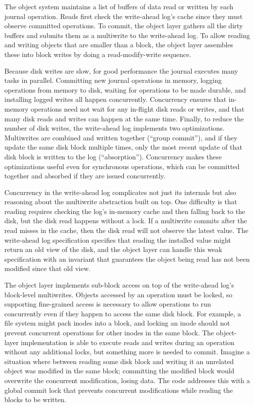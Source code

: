 The object system maintains a list of buffers of data read or written by each journal operation.
Reads first check the write-ahead log's cache since
they must observe committed operations. To commit, the object
layer gathers all the dirty buffers and submits them as a multiwrite to the
write-ahead log. To allow reading and writing objects that are smaller than a
block, the object layer assembles these into block writes by doing a
read-modify-write sequence.

Because disk writes are slow, for good performance the journal executes many
tasks in parallel. Committing new journal operations in memory, logging operations
from memory to disk, waiting for operations to be made durable, and
installing logged writes all happen concurrently.  Concurrency ensures that
in-memory operations
need not wait for any in-flight disk reads or writes, and that many
disk reads and writes can happen at the same time.  Finally, to reduce the
number of disk writes, the write-ahead log implements two optimizations.
Multiwrites are combined and written
together (``group commit''), and if they update the same disk
block multiple times, only the most recent update of that disk block is
written to the log (``absorption''). Concurrency makes these optimizations
useful even for synchronous operations, which can be committed together and
absorbed if they are issued concurrently.

Concurrency in the write-ahead log complicates not just its internals but also
reasoning about the multiwrite abstraction built on top. One difficulty is that
reading requires checking the log's in-memory cache and then falling back to the disk,
but the disk read happens without a lock. If a multiwrite commits after the read
misses in the cache, then the disk read will not observe the latest value. The
write-ahead log specification specifies that reading the installed value might return an
old view of the disk, and the object layer can handle this weak specification with
an invariant that guarantees the object being read has not been modified since
that old view.

The object layer implements sub-block access on top of the write-ahead
log's block-level multiwrites. Objects accessed by an operation must be locked,
so supporting fine-grained access is necessary to allow operations to run
concurrently even if they happen to access the same disk block. For example, a
file system might pack inodes into a block, and locking an inode should not
prevent concurrent operations for other inodes in the same block. The
object-layer implementation is able to execute reads and writes during an
operation without any additional locks, but something more is needed to commit.
Imagine a situation where between reading some disk block and writing it an
unrelated object was modified in the same block; committing the modified block
would overwrite the concurrent modification, losing data. The code addresses
this with a global commit lock that prevents concurrent modifications while
reading the blocks to be written.

